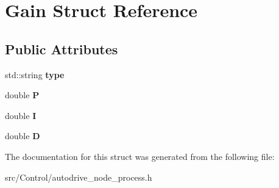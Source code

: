\hypertarget{structGain}{}\section{Gain Struct Reference}
\label{structGain}
\subsection*{Public Attributes}
\begin{DoxyCompactItemize}
\item 
\mbox{\label{structGain_ac167527b53eee2e4901a1d5ed020a1db}} 
std\+::string {\bfseries type}
\item 
\mbox{\label{structGain_ae6a3e7069d83c5e9b4dec96c15510da2}} 
double {\bfseries P}
\item 
\mbox{\label{structGain_af94ef39905bcf8d4c611df5f467219d2}} 
double {\bfseries I}
\item 
\mbox{\label{structGain_a8ab5da3c8ce8416d15375e5745e8d474}} 
double {\bfseries D}
\end{DoxyCompactItemize}


The documentation for this struct was generated from the following file\+:\begin{DoxyCompactItemize}
\item 
src/\+Control/autodrive\+\_\+node\+\_\+process.\+h\end{DoxyCompactItemize}
